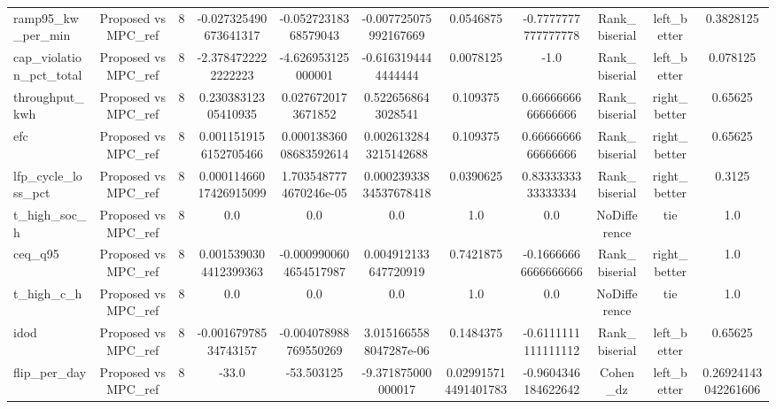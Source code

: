 \begin{table}[t]
\begin{tabular}{lcccccccccc}
ramp95\_kw\_per\_min & Proposed vs MPC\_ref & 8 & -0.027325490673641317 & -0.05272318368579043 & -0.007725075992167669 & 0.0546875 & -0.7777777777777778 & Rank\_biserial & left\_better & 0.3828125 \\
cap\_violation\_pct\_total & Proposed vs MPC\_ref & 8 & -2.3784722222222223 & -4.626953125000001 & -0.6163194444444444 & 0.0078125 & -1.0 & Rank\_biserial & left\_better & 0.078125 \\
throughput\_kwh & Proposed vs MPC\_ref & 8 & 0.23038312305410935 & 0.0276720173671852 & 0.5226568643028541 & 0.109375 & 0.6666666666666666 & Rank\_biserial & right\_better & 0.65625 \\
efc & Proposed vs MPC\_ref & 8 & 0.0011519156152705466 & 0.00013836008683592614 & 0.0026132843215142688 & 0.109375 & 0.6666666666666666 & Rank\_biserial & right\_better & 0.65625 \\
lfp\_cycle\_loss\_pct & Proposed vs MPC\_ref & 8 & 0.00011466017426915099 & 1.7035487774670246e-05 & 0.00023933834537678418 & 0.0390625 & 0.8333333333333334 & Rank\_biserial & right\_better & 0.3125 \\
t\_high\_soc\_h & Proposed vs MPC\_ref & 8 & 0.0 & 0.0 & 0.0 & 1.0 & 0.0 & NoDifference & tie & 1.0 \\
ceq\_q95 & Proposed vs MPC\_ref & 8 & 0.0015390304412399363 & -0.0009900604654517987 & 0.004912133647720919 & 0.7421875 & -0.16666666666666666 & Rank\_biserial & right\_better & 1.0 \\
t\_high\_c\_h & Proposed vs MPC\_ref & 8 & 0.0 & 0.0 & 0.0 & 1.0 & 0.0 & NoDifference & tie & 1.0 \\
idod & Proposed vs MPC\_ref & 8 & -0.00167978534743157 & -0.004078988769550269 & 3.0151665588047287e-06 & 0.1484375 & -0.6111111111111112 & Rank\_biserial & left\_better & 0.65625 \\
flip\_per\_day & Proposed vs MPC\_ref & 8 & -33.0 & -53.503125 & -9.371875000000017 & 0.029915714491401783 & -0.9604346184622642 & Cohen\_dz & left\_better & 0.26924143042261606 \\
\bottomrule
\end{tabular}
\end{table}